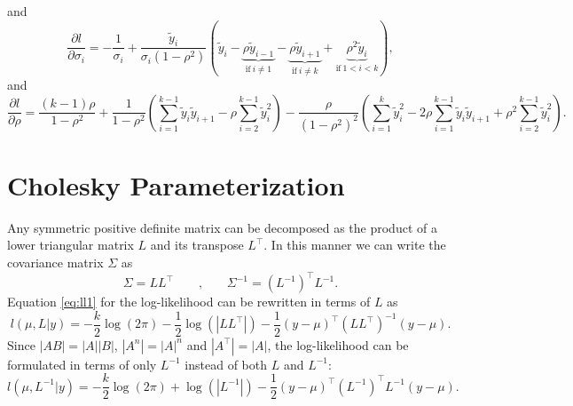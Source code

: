 \documentclass{article}
\begin{document}
%
and
%
\begin{equation}
  \frac{\partial l}{\partial \sigma_i} = - \frac{1}{\sigma_i} + \frac{\tilde{y}_i}{\sigma_i(1-\rho^2)}
  \left( \tilde{y}_i
         - \underbrace{\rho\tilde{y}_{i-1}}_{\text{if} \: i \neq 1}
         - \underbrace{\rho\tilde{y}_{i+1}}_{\text{if} \: i \neq k}
         + \underbrace{\rho^2\tilde{y}_i}_{\text{if} \: 1 < i < k}
  \right),
\end{equation}
%
and
%
\begin{equation}
  \frac{\partial l}{\partial \rho}
  = \frac{(k-1)\rho}{1-\rho^2}
  + \frac{1}{1-\rho^2} \left( \sum_{i=1}^{k-1} \tilde{y}_i \tilde{y}_{i+1} - \rho \sum_{i=2}^{k-1} \tilde{y}_i^2  \right)
  - \frac{\rho}{(1-\rho^2)^2} \left( \sum_{i=1}^{k} \tilde{y}_i^2 - 2\rho \sum_{i=1}^{k-1} \tilde{y}_i \tilde{y}_{i+1} + \rho^2 \sum_{i=2}^{k-1} \tilde{y}_i^2 \right).
\end{equation}


\newpage
\section{Cholesky Parameterization}

Any symmetric positive definite matrix can be decomposed as the product of a
lower triangular matrix $L$ and its transpose $L^\top$. In this manner 
we can write the covariance matrix $\Sigma$ as
%
\begin{equation}
 \Sigma = L L^\top
 \qquad \text{,} \qquad
 \Sigma^{-1} = (L^{-1})^\top L^{-1}.
 \label{eq:basic_chol}
\end{equation}
%
Equation \ref{eq:ll1} for the log-likelihood can be rewritten in terms of $L$ as 
%
\begin{equation}
 l(\mu, L|y) = -\frac{k}{2}\log(2\pi) - \frac{1}{2}\log(|L L^\top|) - \frac{1}{2} (y-\mu)^\top 
	(L L^\top)^{-1} (y-\mu).
 \label{eq:ll_chol}
\end{equation}
%
Since $|A B| = |A| |B|$, $|A^n| = |A|^n$ and $|A^\top| = |A|$, the 
log-likelihood can be formulated in terms of only $L^{-1}$ instead of 
both $L$ and $L^{-1}$:
%
\begin{equation}
	l(\mu, L^{-1}|y) = -\frac{k}{2}\log(2\pi) + \log(|L^{-1}|) 
	- \frac{1}{2} (y-\mu)^\top (L^{-1})^\top L^{-1} (y-\mu).
 \label{eq:ll_choles}
\end{equation}
%
\end{document}

